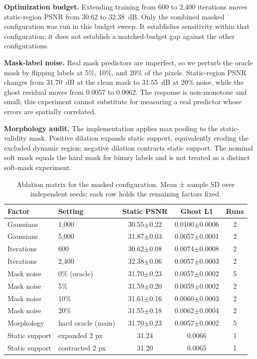 \documentclass[10pt,conference]{IEEEtran}
\begin{document}
\textbf{Optimization budget.} Extending training from 600 to 2{,}400 iterations moves static-region PSNR from 30.62 to 32.38~dB. Only the combined masked configuration was run in this budget sweep. It establishes sensitivity within that configuration; it does not establish a matched-budget gap against the other configurations.

\textbf{Mask-label noise.} Real mask predictors are imperfect, so we perturb the oracle mask by flipping labels at 5\%, 10\%, and 20\% of the pixels. Static-region PSNR changes from 31.70~dB at the clean mask to 31.55~dB at 20\% noise, while the ghost residual moves from 0.0057 to 0.0062. The response is non-monotone and small; this experiment cannot substitute for measuring a real predictor whose errors are spatially correlated.

\textbf{Morphology audit.} The implementation applies max pooling to the static-validity mask. Positive dilation expands static support, equivalently eroding the excluded dynamic region; negative dilation contracts static support. The nominal soft mask equals the hard mask for binary labels and is not treated as a distinct soft-mask experiment.

\begin{table}[t]
\caption{Ablation matrix for the masked configuration. Mean ± sample SD over independent seeds; each row holds the remaining factors fixed.}
\label{tab:ablation}
\centering\scriptsize
\begin{tabular}{llccc}
\toprule
Factor & Setting & Static PSNR & Ghost L1 & Runs \\
\midrule
Gaussians & 1,000 & 30.55$\pm$0.22 & 0.0100$\pm$0.0006 & 2 \\
Gaussians & 5,000 & 31.87$\pm$0.03 & 0.0057$\pm$0.0001 & 2 \\
\midrule
Iterations & 600 & 30.62$\pm$0.08 & 0.0074$\pm$0.0008 & 2 \\
Iterations & 2,400 & 32.38$\pm$0.06 & 0.0057$\pm$0.0003 & 2 \\
\midrule
Mask noise & 0\% (oracle) & 31.70$\pm$0.23 & 0.0057$\pm$0.0002 & 5 \\
Mask noise & 5\% & 31.59$\pm$0.20 & 0.0059$\pm$0.0002 & 2 \\
Mask noise & 10\% & 31.61$\pm$0.16 & 0.0060$\pm$0.0003 & 2 \\
Mask noise & 20\% & 31.55$\pm$0.18 & 0.0062$\pm$0.0004 & 2 \\
\midrule
Morphology & hard oracle (main) & 31.70$\pm$0.23 & 0.0057$\pm$0.0002 & 5 \\
Static support & expanded 2 px & 31.24 & 0.0066 & 1 \\
Static support & contracted 2 px & 31.20 & 0.0065 & 1 \\
\bottomrule
\end{tabular}
\end{table}
\end{document}
